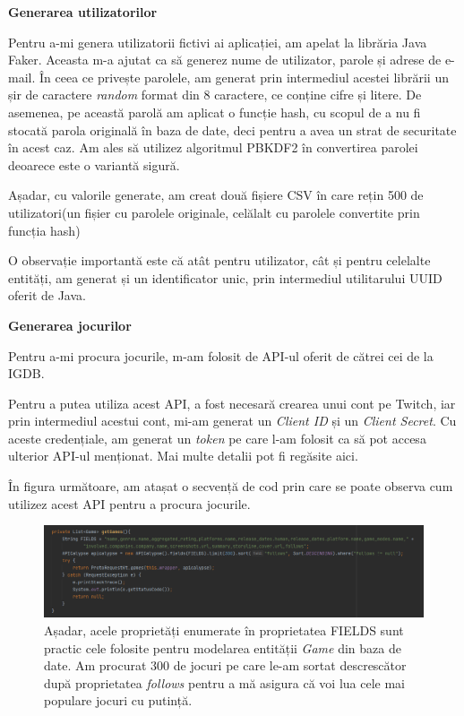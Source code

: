 \documentclass[12pt,a4paper]{report}
\begin{document}
\bigskip
\textbf{Generarea utilizatorilor}
\bigskip

Pentru a-mi genera utilizatorii fictivi ai aplicației, am apelat la librăria Java Faker. Aceasta m-a ajutat ca să generez nume de utilizator, parole și adrese de e-mail. În ceea ce privește parolele, am generat prin intermediul acestei librării un șir de caractere \emph{random} format din 8 caractere, ce conține cifre și litere. De asemenea, pe această parolă am aplicat o funcție hash, cu scopul de a nu fi stocată parola originală în baza de date, deci pentru a avea un strat de securitate în acest caz. Am ales să utilizez algoritmul PBKDF2 în convertirea parolei deoarece este o variantă sigură. \cite{15}

Așadar, cu valorile generate, am creat două fișiere CSV în care rețin 500 de utilizatori(un fișier cu parolele originale, celălalt cu parolele convertite prin funcția hash)

O observație importantă este că atât pentru utilizator, cât și pentru celelalte entități, am generat și un identificator unic, prin intermediul utilitarului UUID oferit de Java.

\bigskip
\textbf{Generarea jocurilor}
\bigskip

Pentru a-mi procura jocurile, m-am folosit de API-ul oferit de cătrei cei de la IGDB.

Pentru a putea utiliza acest API, a fost necesară crearea unui cont pe Twitch, iar prin intermediul acestui cont, mi-am generat un \emph{Client ID} și un \emph{Client Secret}. Cu aceste credențiale, am generat un \emph{token} pe care l-am folosit ca să pot accesa ulterior API-ul menționat. Mai multe detalii pot fi regăsite aici. \cite{16}

În figura următoare, am atașat o secvență de cod prin care se poate observa cum utilizez acest API pentru a procura jocurile.

\begin{figure}[H]
\centering
\caption{}
\includegraphics[scale = 0.6]{exemplu_10_games}
\caption*{Așadar, acele proprietăți enumerate în proprietatea FIELDS sunt practic cele folosite pentru modelarea entității \emph{Game} din baza de date. Am procurat 300 de jocuri pe care le-am sortat descrescător după proprietatea \emph{follows} pentru a mă asigura că voi lua cele mai populare jocuri cu putință. }
\end{figure}
\end{document}
